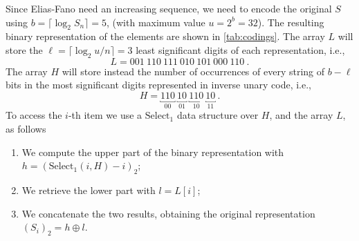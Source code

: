Since Elias-Fano need an increasing sequence, we need to encode the original $S$
using $b = \lceil \log_2 S_n \rceil = 5$, (with maximum value $u = 2^b = 32$).
The resulting binary representation of the elements are shown in
\autoref{tab:codings}. The array $L$ will store the $\ell = \lceil\log_2
u/n\rceil = 3$ least significant digits of each representation, i.e., $$L = 001\
110\ 111\ 010\ 101\ 000\ 110\ .$$ The array $H$ will store instead the number of
occurrences of every string of $b - \ell$ bits in the most significant digits
represented in inverse unary code, i.e., $$H = \underbracket{110}_{00}\
\underbracket{10}_{01}\ \underbracket{110}_{10}\ \underbracket{10}_{11}\ .$$ To
access the $i$-th item we use a $\text{Select}_1$ data structure over $H$, and
the array $L$, as follows
%
\begin{enumerate}

  \item We compute the upper part of the binary representation with $h =
  (\text{Select}_1(i, H) - i)_2$;

  \item We retrieve the lower part with $l = L[i]$;

  \item We concatenate the two results, obtaining the original
  representation $(S_i)_2 = h \oplus l$.

\end{enumerate}
